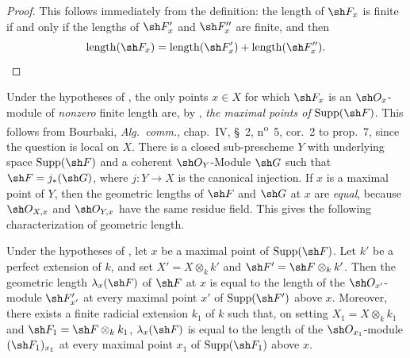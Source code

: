 \begin{proof}
This follows immediately from the definition: the length of
$\sh F_x$ is finite if and only if the lengths of $\sh F'_x$ and
$\sh F''_x$ are finite, and then
\[
\operatorname{length}(\sh F_x)
=\operatorname{length}(\sh F'_x)+
 \operatorname{length}(\sh F''_x).
\]
\end{proof}

\begin{env}[4.7.7]
\label{IV.4.7.7}
Under the hypotheses of , the only points $x\in X$ for
which $\sh F_x$ is an $\sh O_x$-module of \emph{nonzero} finite length
are, by , \emph{the maximal points of}
$\operatorname{Supp}(\sh F)$.
This follows from Bourbaki, \emph{Alg.\ comm.}, chap.~IV, \S~2,
n\textsuperscript{o}~5, cor.~2 to prop.~7, since the question is local
on $X$.
There is a closed sub-prescheme $Y$ with underlying space
$\operatorname{Supp}(\sh F)$ and a coherent $\sh O_Y$-Module $\sh G$
such that $\sh F=j_*(\sh G)$, where $j:Y\to X$ is the canonical
injection.
If $x$ is a maximal point of $Y$, then the geometric lengths of
$\sh F$ and $\sh G$ at $x$ are \emph{equal}, because
$\sh O_{X,x}$ and $\sh O_{Y,x}$ have the same residue field.
This gives the following characterization of geometric length.
\end{env}

\begin{proposition}[4.7.8]
\label{IV.4.7.8}
Under the hypotheses of , let $x$ be a maximal point
of $\operatorname{Supp}(\sh F)$.
Let $k'$ be a perfect extension of $k$, and set
$X'=X\otimes_k k'$ and $\sh F'=\sh F\otimes_k k'$.
Then the geometric length $\lambda_x(\sh F)$ of $\sh F$ at $x$ is equal
to the length of the $\sh O_{x'}$-module $\sh F'_{x'}$ at every
maximal point $x'$ of $\operatorname{Supp}(\sh F')$ above $x$.
Moreover, there exists a finite radicial extension $k_1$ of $k$ such
that, on setting $X_1=X\otimes_k k_1$ and
$\sh F_1=\sh F\otimes_k k_1$, $\lambda_x(\sh F)$ is equal to the length
of the $\sh O_{x_1}$-module $(\sh F_1)_{x_1}$ at every
maximal point $x_1$ of $\operatorname{Supp}(\sh F_1)$ above $x$.
\end{proposition}

